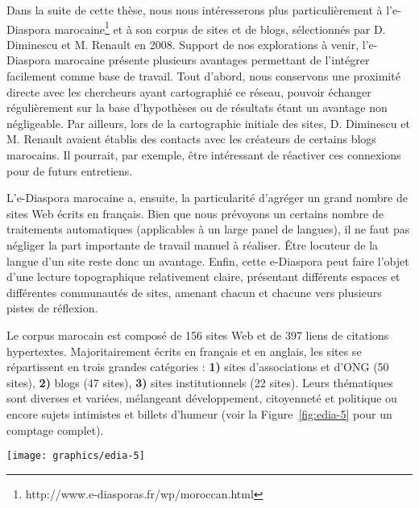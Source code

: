 \documentclass[symmetric,justified,marginals=raggedouter]{tufte-book}
\begin{document}
\noindent Dans la suite de cette thèse, nous nous intéresserons plus particulièrement à l'e-Diaspora marocaine\footnote{\RaggedOuter http://www.e-diasporas.fr/wp/moroccan.html} et à son corpus de sites et de blogs, sélectionnés par D. Diminescu et M. Renault en 2008. Support de nos explorations à venir, l'e-Diaspora marocaine présente plusieurs avantages permettant de l'intégrer facilement comme base de travail. Tout d'abord, nous conservons une proximité directe avec les chercheurs ayant cartographié ce réseau, pouvoir échanger régulièrement sur la base d'hypothèses ou de résultats étant un avantage non négligeable. Par ailleurs, lors de la cartographie initiale des sites, D. Diminescu et M. Renault avaient établis des contacts avec les créateurs de certains blogs marocains. Il pourrait, par exemple, être intéressant de réactiver ces connexions pour de futurs entretiens.  

L'e-Diaspora marocaine a, ensuite, la particularité d'agréger un grand nombre de sites Web écrits en français. Bien que nous prévoyons un certains nombre de traitements automatiques (applicables à un large panel de langues), il ne faut pas négliger la part importante de travail manuel à réaliser. Être locuteur de la langue d'un site reste donc un avantage. Enfin, cette e-Diaspora peut faire l'objet d'une lecture topographique relativement claire, présentant différents espaces et différentes communautés de sites, amenant chacun et chacune vers plusieurs pistes de réflexion. 

Le corpus marocain est composé de 156 sites Web et de 397 liens de citations hypertextes. Majoritairement écrits en français et en anglais, les sites se répartissent en trois grandes catégories : \textbf{1)} sites d'associa\-tions et d'ONG (50 sites), \textbf{2)} blogs (47 sites), \textbf{3)} sites institutionnels (22 sites). Leurs thématiques sont diverses et variées, mélangeant développement, citoyenneté et politique ou encore sujets intimistes et billets d'hum\-eur (voir la Figure~\ref{fig:edia-5} pour un comptage complet).

\begin{figure*}
  \texttt{[image: graphics/edia-5]}
  \caption{Répartition des sites de l'e-Diaspora marocaine par catégorie, sous-catégorie et langue principale (source : Atlas e-Diaspora \url{https://frama.link/Pyt3Aq2x})}
  \label{fig:edia-5}
\end{figure*} 
\end{document}
